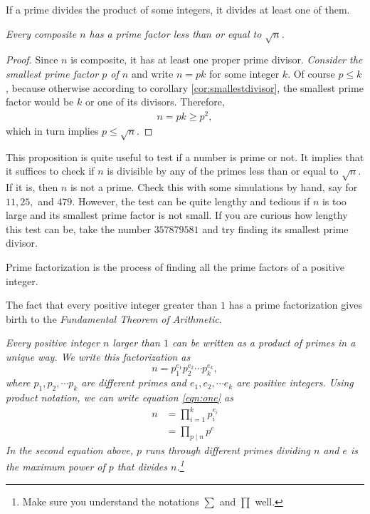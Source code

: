 \documentclass{subfile}
\begin{document}
	\begin{corollary}\label{cor:euclidgeneral}
		If a prime divides the product of some integers, it divides at least one of them.
	\end{corollary}

	\begin{proposition}\slshape\label{factorsqrt}
		Every composite $n$ has a prime factor less than or equal to $\sqrt{n}$.
	\end{proposition}

	\begin{proof}
		Since $n$ is composite, it has at least one proper prime divisor. {\it Consider the smallest prime factor $p$ of $n$} and write $n=pk$ for some integer $k$. Of course $p\leq k$, because otherwise according to corollary \eqref{cor:smallestdivisor}, the smallest prime factor would be $k$ or one of its divisors. Therefore,
		\begin{align*}
			n=pk\geq p^2,
		\end{align*}
		which in turn implies $p\leq \sqrt{n}$.
	\end{proof}

	This proposition is quite useful to test if a number is prime or not. It implies that it suffices to check if $n$ is divisible by any of the primes less than or equal to $\sqrt{n}$. If it is, then $n$ is not a prime. Check this with some simulations by hand, say for $11,25,$ and $479$. However, the test can be quite lengthy and tedious if $n$ is too large and its smallest prime factor is not small. If you are curious how lengthy this test can be, take the number $357879581$ and try finding its smallest prime divisor.

	\begin{definition}
		Prime factorization is the process of finding all the prime factors of a positive integer.
	\end{definition}

	The fact that every positive integer greater than $1$ has a prime factorization gives birth to the \textit{Fundamental Theorem of Arithmetic}.

	\begin{theorem}\slshape
		Every positive integer $n$ larger than $1$ can be written as a product of primes \textit{in a unique way}. We write this factorization as
		\begin{equation}
			n=p_1^{e_1}p_2^{e_2}\cdots p_k^{e_k},\label{eqn:one}
		\end{equation}
		where $p_1,p_2,\cdots p_k$ are different primes and $e_1,e_2,\cdots e_k$ are positive integers. Using product notation, we can write equation \eqref{eqn:one} as
		\begin{align*}
			n
				&=\prod\limits_{i=1}^{k}p_i^{e_i}\\
				&=\prod\limits_{p\mid n}p^e
		\end{align*}
		In the second equation above, $p$ runs through different primes dividing $n$ and $e$ is the maximum power of $p$ that divides $n$.\footnote{Make sure you understand the notations $\sum$ and $\prod$ well.}
	\end{theorem}
\end{document}
